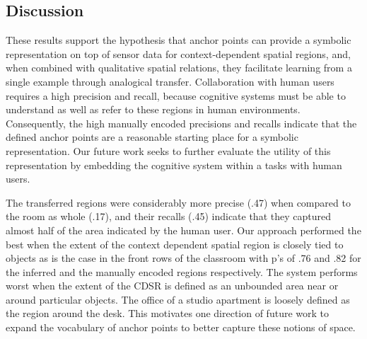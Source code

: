 \subsection{Discussion}

These results support the hypothesis that anchor points can provide a symbolic representation on top of sensor data for context-dependent spatial regions, and, when combined with qualitative spatial relations, they facilitate learning from a single example through analogical transfer. Collaboration with human users requires a high precision and recall, because cognitive systems must be able to understand as well as refer to these regions in human environments. Consequently, the high manually encoded precisions and recalls indicate that the defined anchor points are a reasonable starting place for a symbolic representation. Our future work seeks to further evaluate the utility of this representation by embedding the cognitive system within a tasks with human users.

The transferred regions were considerably more precise (.47) when compared to the room as whole (.17), and their recalls (.45) indicate that they captured almost half of the area indicated by the human user. Our approach performed the best when the extent of the context dependent spatial region is closely tied to objects as is the case in the front rows of the classroom with p's of .76 and .82 for the inferred and the manually encoded regions respectively. The system performs worst when the extent of the CDSR is defined as an unbounded area near or around particular objects. The office of a studio apartment is loosely defined as the region around the desk. This motivates one direction of future work to expand the vocabulary of anchor points to better capture these notions of space.
